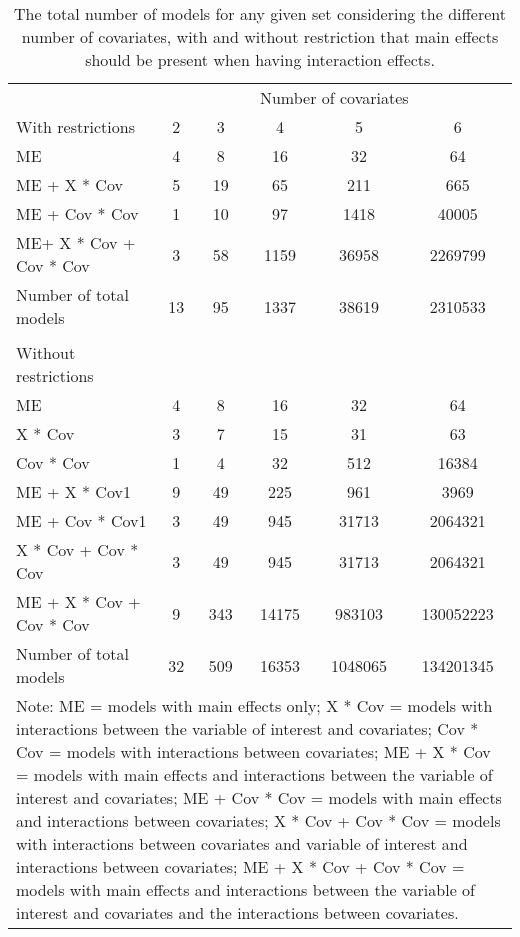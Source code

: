 \begin{table}[!h]
\centering
\caption{The total number of models for any given set considering the different number of covariates, with and without restriction that main effects should be present when having interaction effects.} 
\begin{tabular}{lccccc}
  \hline
  & \multicolumn{5}{c}{Number of covariates} \\\cmidrule{2-6}
With restrictions & 2 & 3 & 4 & 5 & 6 \\ 
  \hline
ME & 4 & 8 & 16 & 32 & 64 \\ 
  ME + X * Cov & 5 & 19 & 65 & 211 & 665 \\ 
  ME + Cov * Cov & 1 & 10 & 97 & 1418 & 40005 \\ 
  ME+ X * Cov + Cov * Cov & 3 & 58 & 1159 & 36958 & 2269799 \\
  \hline 
  Number of total models & 13 & 95 & 1337 & 38619 & 2310533 \\ 
  \hline \\
  Without restrictions \\ 
  \hline
  ME & 4 & 8 & 16 & 32 & 64 \\ 
  X * Cov & 3 & 7 & 15 & 31 & 63 \\ 
  Cov * Cov & 1 & 4 & 32 & 512 & 16384 \\ 
  ME + X * Cov1 & 9 & 49 & 225 & 961 & 3969 \\ 
  ME + Cov * Cov1 & 3 & 49 & 945 & 31713 & 2064321 \\ 
  X * Cov + Cov * Cov & 3 & 49 & 945 & 31713 & 2064321 \\ 
  ME + X * Cov + Cov * Cov & 9 & 343 & 14175 & 983103 & 130052223 \\ 
  \hline
  Number of total models & 32 & 509 & 16353 & 1048065 & 134201345 \\ 
   \hline 
\multicolumn{6}{p{13cm}}{\footnotesize{Note: ME = models with main effects only; X * Cov = models with interactions between the variable of interest and covariates; Cov * Cov = models with interactions between covariates;  ME + X * Cov = models with main effects and interactions between the variable of interest and covariates; ME + Cov * Cov = models with main effects and interactions between covariates; X * Cov + Cov * Cov = models with interactions between covariates and variable of interest and interactions between covariates; ME + X * Cov + Cov * Cov = models with main effects and interactions between the variable of interest and covariates and the interactions between covariates.}} 

\end{tabular}
\end{table}
